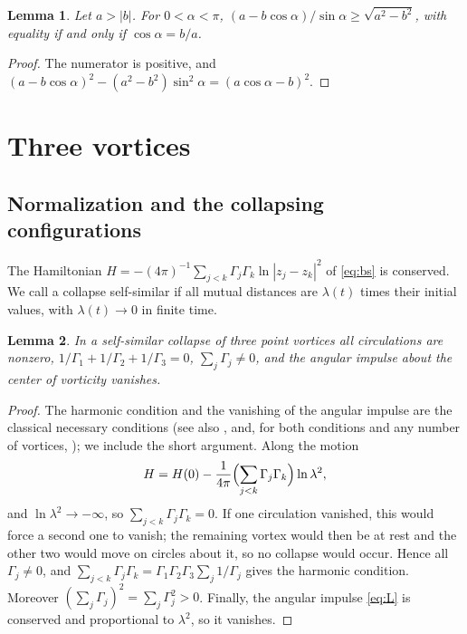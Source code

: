 \documentclass[11pt]{article}
\newtheorem{lemma}{Lemma}
\theoremstyle{definition}
\begin{document}
\begin{lemma}\label{lem:ineq}
Let $a > |b|$. For $0 < \alpha < \pi$, $(a - b\cos\alpha)/\sin\alpha \ge \sqrt{a^2 - b^2}$, with equality if and only if $\cos\alpha = b/a$.
\end{lemma}

\begin{proof}
The numerator is positive, and $(a - b\cos\alpha)^2 - (a^2 - b^2)\sin^2\alpha = (a\cos\alpha - b)^2$.
\end{proof}

\section{Three vortices}\label{sec:three}

\subsection{Normalization and the collapsing configurations}

The Hamiltonian $H = -(4\pi)^{-1} \sum_{j<k} \Gamma_j \Gamma_k \ln|z_j - z_k|^2$ of \eqref{eq:bs} is conserved. We call a collapse self-similar if all mutual distances are $\lambda(t)$ times their initial values, with $\lambda(t) \to 0$ in finite time.

\begin{lemma}\label{lem:necessary}
In a self-similar collapse of three point vortices all circulations are nonzero, $1/\Gamma_1 + 1/\Gamma_2 + 1/\Gamma_3 = 0$, $\sum_j \Gamma_j \ne 0$, and the angular impulse about the center of vorticity vanishes.
\end{lemma}

\begin{proof}
The harmonic condition and the vanishing of the angular impulse are the classical necessary conditions \cite[Sect.~II~B]{aref2010} (see also \cite[Eqs.~(3.20)--(3.21), (3.33)]{kimura1987}, \cite[Sect.~3]{bl1998} and, for both conditions and any number of vortices, \cite[Eqs.~(26)--(28)]{dk2014}); we include the short argument. Along the motion
\[
  H = H(0) - \frac{1}{4\pi} \Bigl(\sum_{j<k} \Gamma_j \Gamma_k\Bigr) \ln\lambda^2,
\]
and $\ln\lambda^2 \to -\infty$, so $\sum_{j<k} \Gamma_j \Gamma_k = 0$. If one circulation vanished, this would force a second one to vanish; the remaining vortex would then be at rest and the other two would move on circles about it, so no collapse would occur. Hence all $\Gamma_j \ne 0$, and $\sum_{j<k} \Gamma_j \Gamma_k = \Gamma_1\Gamma_2\Gamma_3 \sum_j 1/\Gamma_j$ gives the harmonic condition. Moreover $(\sum_j \Gamma_j)^2 = \sum_j \Gamma_j^2 > 0$. Finally, the angular impulse \eqref{eq:L} is conserved and proportional to $\lambda^2$, so it vanishes.
\end{proof}
\end{document}
